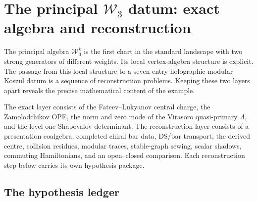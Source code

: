 
\providecommand{\BRST}{\mathrm{BRST}}
\providecommand{\BRSTGauged}{\mathrm{BRSTGaugedChirAlg}}

\chapter{The principal \texorpdfstring{$\mathcal W_3$}{W3} datum:
exact algebra and reconstruction}
\label{ch:w3-holographic-datum}

The principal algebra \(\mathcal W_3^k\) is the first chart in the
standard landscape with two strong generators of different weights.
Its local vertex-algebra structure is explicit.  The passage from this
local structure to a seven-entry holographic modular Koszul datum is a
sequence of reconstruction problems.  Keeping these two layers apart
reveals the precise mathematical content of the example.

The exact layer consists of the Fateev--Lukyanov central charge, the
Zamolodchikov OPE, the norm and zero mode of the Virasoro
quasi-primary \(\Lambda\), and the level-one Shapovalov determinant.
The reconstruction layer consists of a presentation coalgebra,
completed chiral bar data, DS/bar transport, the derived centre,
collision residues, modular traces, stable-graph sewing, scalar
shadows, commuting Hamiltonians, and an open--closed comparison.
Each reconstruction step below carries its own hypothesis package.

\section{The hypothesis ledger}
\label{sec:w3hol-seven-entries}

